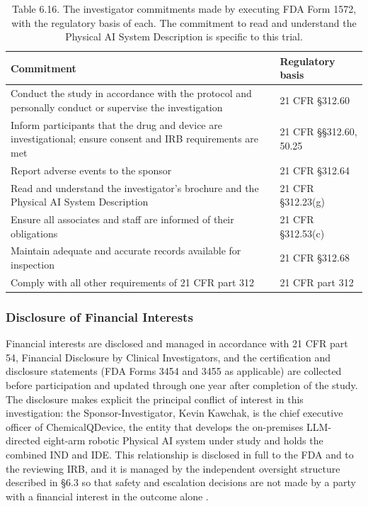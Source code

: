 \begin{table}[t]
\caption{Table 6.16. The investigator commitments made by executing FDA Form 1572,
with the regulatory basis of each. The commitment to read and understand the
Physical AI System Description is specific to this trial.}
\label{tab:sec06-1572}
\centering
\begin{tabularx}{\textwidth}{Y L{3.4cm}}
\toprule
\textbf{Commitment} & \textbf{Regulatory basis} \\
\midrule
Conduct the study in accordance with the protocol and personally conduct or supervise the investigation & 21 CFR \S 312.60 \\
Inform participants that the drug and device are investigational; ensure consent and IRB requirements are met & 21 CFR \S\S 312.60, 50.25 \\
Report adverse events to the sponsor & 21 CFR \S 312.64 \\
Read and understand the investigator's brochure and the Physical AI System Description & 21 CFR \S 312.23(g) \\
Ensure all associates and staff are informed of their obligations & 21 CFR \S 312.53(c) \\
Maintain adequate and accurate records available for inspection & 21 CFR \S 312.68 \\
Comply with all other requirements of 21 CFR part 312 & 21 CFR part 312 \\
\bottomrule
\end{tabularx}
\end{table}

\subsubsection{Disclosure of Financial Interests}

Financial interests are disclosed and managed in accordance with 21 CFR part 54,
Financial Disclosure by Clinical Investigators, and the certification and disclosure
statements (FDA Forms 3454 and 3455 as applicable) are collected before participation
and updated through one year after completion of the study. The disclosure makes
explicit the principal conflict of interest in this investigation: the
Sponsor-Investigator, Kevin Kawchak, is the chief executive officer of
ChemicalQDevice, the entity that develops the on-premises LLM-directed eight-arm
robotic Physical AI system under study and holds the combined IND and IDE. This
relationship is disclosed in full to the FDA and to the reviewing IRB, and it is
managed by the independent oversight structure described in \S 6.3 so that safety and
escalation decisions are not made by a party with a financial interest in the outcome
alone \cite{cfr312paiuni,clintrustpai}.

